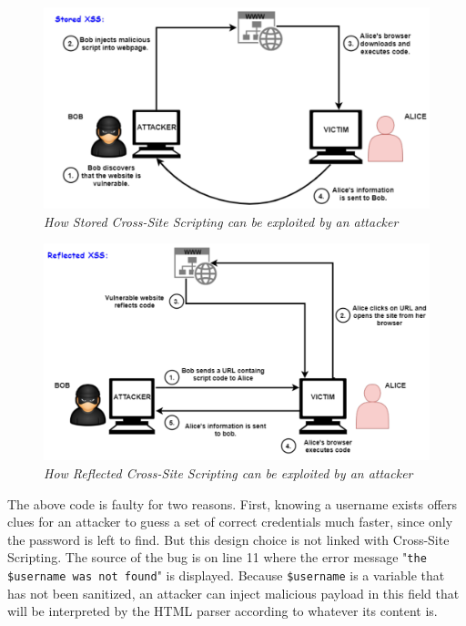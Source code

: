 \begin{figure}[ht]
 \centering
 \captionsetup{justification=centering}
 \includegraphics[width=\linewidth]{figures/storedxss.pdf}
 \caption[How Stored Cross-Site Scripting can be exploited by an attacker]{\textit{How Stored Cross-Site Scripting can be exploited by an attacker}}
 \label{fig:storedxss}
\end{figure}

\begin{figure}[ht]
 \centering
 \captionsetup{justification=centering}
 \includegraphics[width=\linewidth]{figures/reflectedxss.pdf}
 \caption[How Reflected Cross-Site Scripting can be exploited by an attacker]{\textit{How Reflected Cross-Site Scripting can be exploited by an attacker}}
 \label{fig:reflectedxss}
\end{figure}

The above code is faulty for two reasons. First, knowing a username exists offers clues for an attacker to guess a set of correct credentials much faster, since only the password is left to find. But this design choice is not linked with Cross-Site Scripting. The source of the bug is on line 11 where the error message "{\tt the \$username was not found}" is displayed. Because {\tt \$username} is a variable that has not been sanitized, an attacker can inject malicious payload in this field that will be interpreted by the HTML parser according to whatever its content is. 

